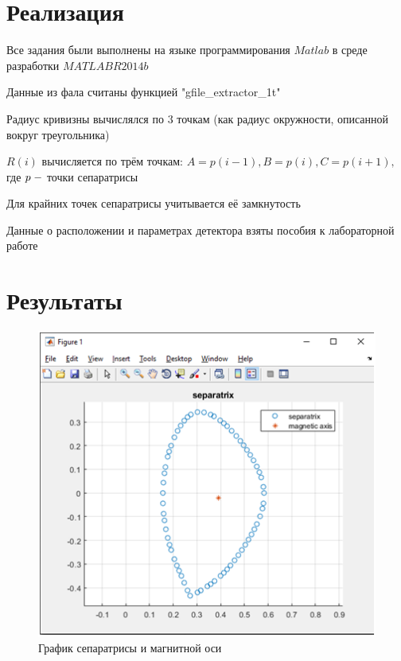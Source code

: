 \documentclass[a4]{article}
\begin{document}
\section{Реализация}
Все задания были выполнены на языке программирования $Matlab$ в среде разработки $MATLAB R2014b$ \hfill \cite{1}

Данные из фала считаны функцией "gfile\_extractor\_1t" \hfill\cite{2}

Радиус кривизны вычислялся по $3$ точкам (как радиус окружности, описанной вокруг треугольника)

$R(i)$ вычисляется по трём точкам: $A = p(i-1), B = p(i), C = p(i+1),$ где $p\;\--$ точки сепаратрисы

Для крайних точек сепаратрисы учитывается её замкнутость

Данные о расположении и параметрах детектора взяты пособия к лабораторной работе \cite{source2}

\section{Результаты}

\begin{figure}[H]
\begin{center}
\caption{График сепаратрисы и магнитной оси }
\includegraphics{pic2.png} 
\end{center}
\end{figure}
\end{document}
